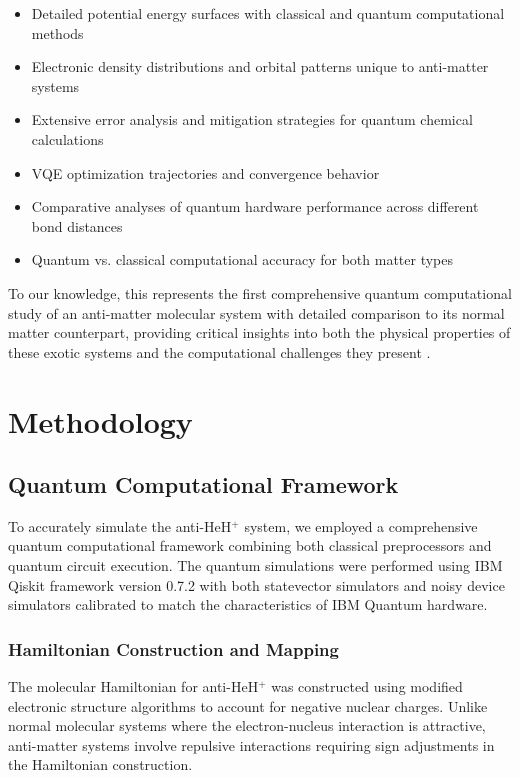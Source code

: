 \documentclass[10pt,twocolumn,a4paper]{article}
\begin{document}
\begin{itemize}
\item Detailed potential energy surfaces with classical and quantum computational methods
\item Electronic density distributions and orbital patterns unique to anti-matter systems
\item Extensive error analysis and mitigation strategies for quantum chemical calculations
\item VQE optimization trajectories and convergence behavior
\item Comparative analyses of quantum hardware performance across different bond distances
\item Quantum vs. classical computational accuracy for both matter types
\end{itemize}

To our knowledge, this represents the first comprehensive quantum computational study of an anti-matter molecular system with detailed comparison to its normal matter counterpart, providing critical insights into both the physical properties of these exotic systems and the computational challenges they present \cite{cerezo2021variational}.

\section{Methodology}
\subsection{Quantum Computational Framework}
To accurately simulate the anti-HeH$^+$ system, we employed a comprehensive quantum computational framework combining both classical preprocessors and quantum circuit execution. The quantum simulations were performed using IBM Qiskit framework version 0.7.2 with both statevector simulators and noisy device simulators calibrated to match the characteristics of IBM Quantum hardware.

\subsubsection{Hamiltonian Construction and Mapping}
The molecular Hamiltonian for anti-HeH$^+$ was constructed using modified electronic structure algorithms to account for negative nuclear charges. Unlike normal molecular systems where the electron-nucleus interaction is attractive, anti-matter systems involve repulsive interactions requiring sign adjustments in the Hamiltonian construction.
\end{document}
